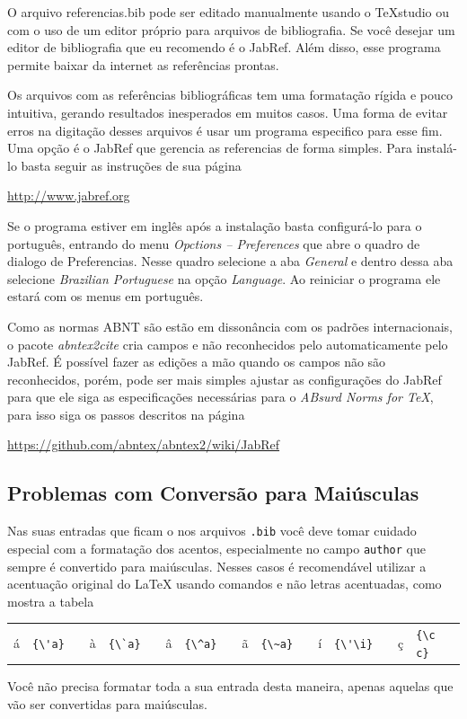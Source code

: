 \begin{apendicesenv}
    O arquivo {\color{red} referencias.bib} pode ser editado manualmente usando o
    TeXstudio ou com o uso de um editor próprio para arquivos de bibliografia.
    Se você desejar um editor de bibliografia que eu recomendo é o JabRef.
    Além disso, esse programa permite baixar da internet as referências prontas.

    Os arquivos com as referências bibliográficas tem uma formatação rígida e
    pouco intuitiva, gerando resultados inesperados em muitos casos. Uma forma
    de evitar erros na digitação desses arquivos é usar um programa especifico
    para esse fim. Uma opção é o JabRef que gerencia as referencias
    de forma simples. Para instalá-lo basta seguir as instruções de sua página
    \begin{center}
        \url{http://www.jabref.org}
    \end{center}
    Se o programa estiver em inglês após a instalação basta configurá-lo para o
    português, entrando do menu \textit{Opctions -- Preferences} que abre o
    quadro de dialogo de Preferencias. Nesse quadro selecione a aba \textit{General}
    e dentro dessa aba selecione \textit{Brazilian Portuguese} na opção \textit{Language}.
    Ao reiniciar o programa ele estará com os menus em português.

    Como as normas ABNT são estão em dissonância com os padrões internacionais,
    o pacote \textit{abntex2cite} cria campos e não reconhecidos pelo automaticamente
    pelo JabRef.
    É possível fazer as edições a mão quando os campos não são reconhecidos,
    porém, pode ser mais simples ajustar as configurações do JabRef para que
    ele siga as especificações necessárias para o \textit{ABsurd Norms for TeX},
    para isso siga os passos descritos na página
    \begin{center}
        \url{https://github.com/abntex/abntex2/wiki/JabRef}
    \end{center}

    \subsection{Problemas com Conversão para Maiúsculas}

    Nas suas entradas que ficam o nos arquivos \texttt{.bib}
    você deve tomar cuidado especial com a formatação dos acentos,
    especialmente no campo \texttt{author} que sempre é convertido para maiúsculas.
    Nesses casos é recomendável utilizar a acentuação original do \LaTeX
    usando comandos e não letras acentuadas, como mostra a tabela
    \begin{center}
        \begin{tabular}{clcclcclcclcclccl}
            á & \verb!{\'a}! &  &
            à & \verb!{\`a}! &  &
            â & \verb!{\^a}! &  &
            ã & \verb!{\~a}! &  &
            í & \verb!{\'\i}! &  &
            ç & \verb!{\c c}!
        \end{tabular}
    \end{center}
    Você não precisa formatar toda a sua entrada desta maneira,
    apenas aquelas que vão ser convertidas para maiúsculas.


\end{apendicesenv}
